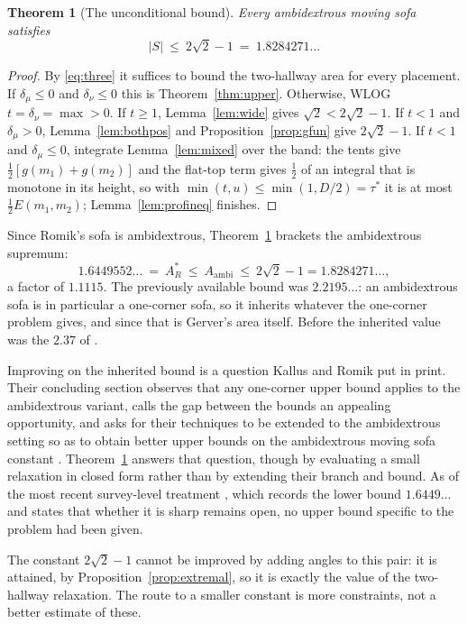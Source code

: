 \documentclass[11pt]{article}
\newtheorem{theorem}{Theorem}
\theoremstyle{definition}
\newcommand{\dmu}{\delta_\mu}
\newcommand{\dnu}{\delta_\nu}
\begin{document}
\begin{theorem}[The unconditional bound]\label{thm:uncond}
Every ambidextrous moving sofa satisfies
\[
  |S|\ \le\ 2\sqrt2-1\ =\ 1.8284271\ldots
\]
\end{theorem}

\begin{proof}
By \eqref{eq:three} it suffices to bound the two-hallway area for every placement. If
$\dmu\le0$ and $\dnu\le0$ this is Theorem~\ref{thm:upper}. Otherwise, WLOG
$t=\dnu=\max>0$. If $t\ge1$, Lemma~\ref{lem:wide} gives $\sqrt2<2\sqrt2-1$. If $t<1$ and
$\dmu>0$, Lemma~\ref{lem:bothpos} and Proposition~\ref{prop:gfun} give $2\sqrt2-1$. If
$t<1$ and $\dmu\le0$, integrate Lemma~\ref{lem:mixed} over the band: the tents give
$\tfrac12[g(m_1)+g(m_2)]$ and the flat-top term gives $\tfrac12$ of an integral that is
monotone in its height, so with $\min(t,u)\le\min(1,D/2)=\tau^\ast$ it is at most
$\tfrac12E(m_1,m_2)$; Lemma~\ref{lem:profineq} finishes.
\end{proof}

Since Romik's sofa is ambidextrous, Theorem~\ref{thm:uncond} brackets the ambidextrous
supremum:
\[
  1.6449552\ldots\ =\ A_R^\ast\ \le\ A_{\mathrm{ambi}}\ \le\
  2\sqrt2-1=1.8284271\ldots,
\]
a factor of $1.1115$. The previously available bound was $2.2195\ldots$: an ambidextrous
sofa is in particular a one-corner sofa, so it inherits whatever the one-corner problem
gives, and since \cite{Bae24} that is Gerver's area itself. Before \cite{Bae24} the
inherited value was the $2.37$ of \cite{KR18}.

Improving on the inherited bound is a question Kallus and Romik put in print. Their
concluding section observes that any one-corner upper bound applies to the ambidextrous
variant, calls the gap between the bounds an appealing opportunity, and asks for their
techniques to be extended to the ambidextrous setting so as to obtain better upper bounds
on the ambidextrous moving sofa constant \cite[\S6]{KR18}. Theorem~\ref{thm:uncond}
answers that question, though by evaluating a small relaxation in closed form rather than
by extending their branch and bound. As of the most recent survey-level treatment
\cite[Problem 6.63]{AE25}, which records the lower bound $1.6449\ldots$ and states that
whether it is sharp remains open, no upper bound specific to the problem had been given.

The constant $2\sqrt2-1$ cannot be improved by adding angles to this pair: it is attained,
by Proposition~\ref{prop:extremal}, so it is exactly the value of the two-hallway
relaxation. The route to a smaller constant is more constraints, not a better estimate of
these.
\end{document}
